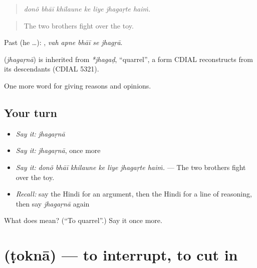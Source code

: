 \begin{quote}
      
\end{quote}

\begin{quote}
\emph{donõ bhāī khilaune ke liye jhagaṛte haiṁ.}
\end{quote}

\begin{quote}
The two brothers fight over the toy.
\end{quote}

Past (he …):     , \emph{vah apne bhāī se jhagṛā}.

\begin{cousinweb}
\textbf{} (\emph{jhagaṛnā}) is inherited from \emph{*jhagaḍ}, \textquotedblleft{}quarrel\textquotedblright{}, a form CDIAL reconstructs from its descendants (CDIAL 5321).
\end{cousinweb}

\begin{grammarlens}[title={What you've built}]
One more word for giving reasons and opinions.
\end{grammarlens}

\subsection*{Your turn}
\begin{itemize}
\raggedright
  \item \emph{Say it:} \emph{jhagaṛnā}
  \item \emph{Say it:} \emph{jhagaṛnā}, once more
  \item \emph{Say it:} \emph{donõ bhāī khilaune ke liye jhagaṛte haiṁ.} — The two brothers fight over the toy.
  \item \emph{Recall:} say the Hindi for an argument, then the Hindi for a line of reasoning, then say \emph{jhagaṛnā} again
\end{itemize}

\begin{tcolorbox}[breakable,colback=teal!4,colframe=teal!35!black,title={Before you move on}]
What does  mean? (\textquotedblleft{}To quarrel\textquotedblright{}.) Say it once more.
\end{tcolorbox}
\section[\texorpdfstring{\hi{टोकना} (ṭoknā)}{टोकना (ṭoknā)}]{ (ṭoknā) — to interrupt, to cut in}

